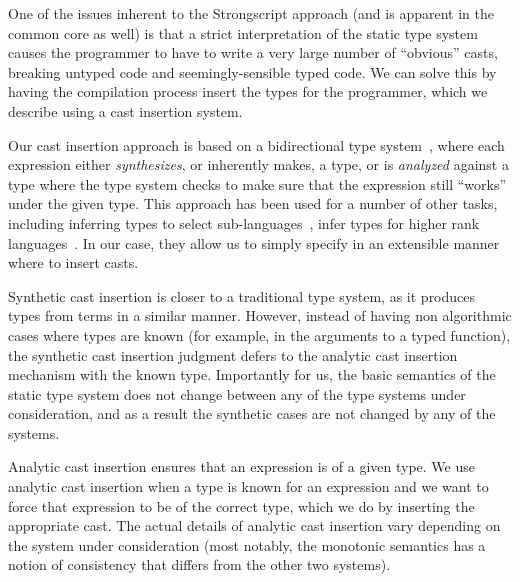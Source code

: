 \documentclass[preprint]{sigplanconf}
\begin{document}
One of the issues inherent to the Strongscript approach (and is apparent in
the common core as well) is that a strict interpretation of the static type
system causes the programmer to have to write a very large number of
``obvious'' casts, breaking untyped code and seemingly-sensible typed
code. We can solve this by having the compilation process insert the types
for the programmer, which we describe using a cast insertion system.

Our cast insertion approach is based on a bidirectional type
system~\cite{}, where each expression either \emph{synthesizes}, or
inherently makes, a type, or is \emph{analyzed} against a type where the
type system checks to make sure that the expression still ``works'' under
the given type. This approach has been used for a number of other tasks,
including inferring types to select sub-languages~\cite{}, infer
types for higher rank languages~\cite{}. In our case, they allow us
to simply specify in an extensible manner where to insert casts.

Synthetic cast insertion is closer to a traditional type system, as it produces types from terms in a similar manner. However, instead of having non algorithmic cases where types are known (for example, in the arguments to a typed function), the synthetic cast insertion judgment defers to the analytic cast insertion mechanism with the known type. Importantly for us, the basic semantics of the static type system does not change between any of the type systems under consideration, and as a result the synthetic cases are not changed by any of the systems.

Analytic cast insertion ensures that an expression is of a given type. We use analytic cast insertion when a type is known for an expression and we want to force that expression to be of the correct type, which we do by inserting the appropriate cast. The actual details of analytic cast insertion vary depending on the system under consideration (most notably, the monotonic semantics has a notion of consistency that differs from the other two systems).
\end{document}
